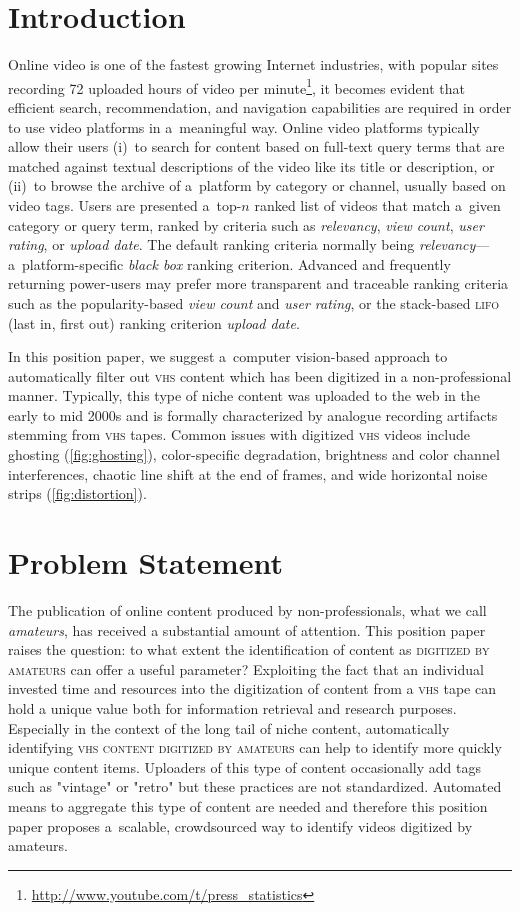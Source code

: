 \documentclass[runningheads,a4paper]{llncs}
\begin{document}
\section{Introduction}
Online video is one of the fastest growing Internet industries, with popular sites recording
72 uploaded hours of video per minute\footnote{\url{http://www.youtube.com/t/press_statistics}},
it becomes evident that efficient search, recommendation, and
navigation capabilities are required in order to use
video platforms in a~meaningful way.
Online video platforms typically allow their users
(i)~to search for content based on full-text query terms
that are matched against textual descriptions
of the video like its title or description,
or (ii)~to browse the archive of a~platform by category or channel,
usually based on video tags.
Users are presented a~top-$n$ ranked list of videos
that match a~given category
or query term, ranked by criteria such as
\emph{relevancy}, \emph{view count},
\emph{user rating}, or \emph{upload date}.
The default ranking criteria normally being
\emph{relevancy}---a~platform-specific \emph{black box} ranking criterion.
Advanced and frequently returning power-users
may prefer more transparent and traceable ranking criteria
such as the popularity-based \emph{view count}
and \emph{user rating}, or the stack-based
{\scshape lifo} (last in, first out) ranking criterion \emph{upload date}.

In this position paper, we suggest a~computer vision-based
approach to automatically filter out {\scshape vhs} content
which has been digitized in a non-professional manner.
Typically, this type of niche content was uploaded to the web
in the early to mid 2000s and is formally characterized by
analogue recording artifacts stemming from {\scshape vhs} tapes.
Common issues with digitized {\scshape vhs} videos include
ghosting (\autoref{fig:ghosting}),
color-specific degradation,
brightness and color channel interferences,
chaotic line shift at the end of frames,
and wide horizontal noise strips (\autoref{fig:distortion}).

\section{Problem Statement}
The publication of online content produced by non-professionals,
what we call \emph{amateurs},
has received a substantial amount of attention.
This position paper raises the question: to what extent
the identification of content as {\scshape digitized by amateurs} can offer a useful parameter?
Exploiting the fact that an individual invested time and resources into the
digitization of content from a {\scshape vhs} tape can hold a unique value
both for information retrieval and research purposes.
Especially in the context of the long tail of niche content,
automatically identifying {\scshape vhs content digitized by amateurs}
can help to identify more quickly unique content items.
Uploaders of this type of content occasionally add tags
such as "vintage" or "retro" but these practices are not standardized.
Automated means to aggregate this type of content are needed
and therefore this position paper proposes a~scalable, crowdsourced way
to identify videos digitized by amateurs.
\end{document}
